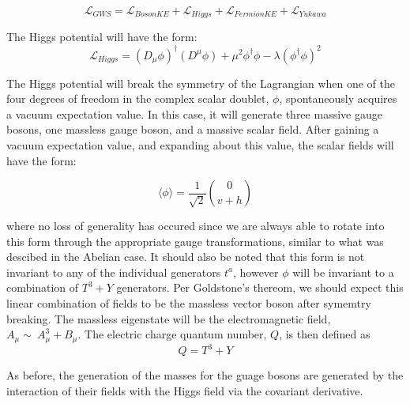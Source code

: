 \begin{equation}\label{eq:ewk_lagrangian_simple}
\mathcal{L}_{GWS} = \mathcal{L}_{Boson KE} + \mathcal{L}_{Higgs} +
\mathcal{L}_{Fermion KE} + \mathcal{L}_{Yukawa} 
\end{equation}

\noindent The Higgs potential will have the form:
\begin{equation}\label{eq:ewk_higgs_lagrangian_term}
\mathcal{L}_{Higgs} = (D_{\mu}\phi)^{\dagger}(D^{\mu}\phi)
+\mu^{2}\phi^{\dagger}\phi - \lambda(\phi^{\dagger}\phi)^{2}
\end{equation}

\noindent The Higgs potential will break the symmetry of
the Lagrangian when one of the four degrees of freedom in the
complex scalar doublet, $\phi$, spontaneously acquires a
vacuum expectation value.  In this case, it will generate
three massive gauge bosons, one massless gauge boson, and a massive
scalar field.  After gaining a vacuum expectation value, and expanding
about this value, the scalar fields will have the form:

\begin{equation}\label{eq:ewk_phi_vev}
\langle\phi\rangle = \frac{1}{\sqrt{2}}\binom{0}{v+h}
\end{equation}

\noindent where no loss of generality has occured since we are always
able to rotate into this form through the appropriate gauge
transformations, similar to what was descibed in the Abelian case.  It
should also be noted that this form is not invariant to any of the
individual generators $t^{a}$, however $\phi$ will be invariant to a
combination of $T^{3}+Y$ generators.  Per Goldstone's thereom, we
should expect this linear combination of fields to be the massless
vector boson after symemtry breaking.  The massless eigenstate will be
the electromagnetic field, $A_{\mu} \sim~A_{\mu}^{3} + B_{\mu}$.  The
electric charge quantum number, $Q$, is then defined as 
\begin{equation}\label{ewk_Q_quantum_number}
Q = T^{3}+Y
\end{equation}

\par As before, the generation of the masses for the guage bosons are
generated by the interaction of their fields with the Higgs field via
the covariant derivative.  

